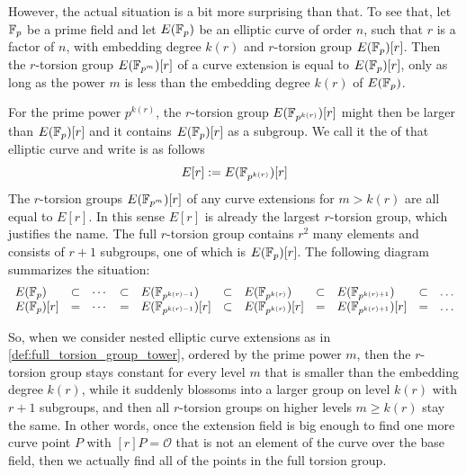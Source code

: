 However, the actual situation is a bit more surprising than that. To see that, let $\mathbb{F}_p$ be a prime field and let $E(\mathbb{F}_p)$ be an elliptic curve of order $n$, such that $r$ is a factor of $n$, with embedding degree $k(r)$ and $r$-torsion group $E(\mathbb{F}_p)[r]$. Then the $r$-torsion group $E(\mathbb{F}_{p^m})[r]$ of a curve extension is equal to $E(\mathbb{F}_p)[r]$, only as long as the power $m$ is less than the embedding degree $k(r)$ of $E(\mathbb{F}_p)$. 

For the prime power $p^{k(r)}$, the $r$-torsion group $E(\mathbb{F}_{p^{k(r)}})[r]$ might then be larger than $E(\mathbb{F}_p)[r]$ and it contains $E(\mathbb{F}_p)[r]$ as a subgroup. We call it the  of that elliptic curve and write is as follows
\begin{equation}
\label{def:full_torsion_group}
E[r] := E(\mathbb{F}_{p^{k(r)}})[r]
\end{equation}
The $r$-torsion groups $E(\mathbb{F}_{p^m})[r]$ of any curve extensions for $m>k(r)$ are all equal to $E[r]$. In this sense $E[r]$ is already the largest $r$-torsion group, which justifies the name. The full $r$-torsion group contains $r^2$ many elements and consists of $r+1$ subgroups, one of which is $E(\mathbb{F}_{p})[r]$. The following diagram summarizes the situation:
\begin{equation}
\label{def:full_torsion_group_tower}
\begin{array}{lccclclclcl}
E(\mathbb{F}_{p}) & \subset & \cdots  & \subset & E(\mathbb{F}_{p^{k(r)-1}}) & \subset & E(\mathbb{F}_{p^{k(r)}}) & \subset & E(\mathbb{F}_{p^{k(r)+1}}) & \subset & \ldots\\
E(\mathbb{F}_{p})[r] & = & \cdots  & = & E(\mathbb{F}_{p^{k(r)-1}})[r] & \subset & E(\mathbb{F}_{p^{k(r)}})[r] & = & 
E(\mathbb{F}_{p^{k(r)+1}})[r] & = & \ldots
\end{array}
\end{equation}

So, when we consider nested elliptic curve extensions as in \ref{def:full_torsion_group_tower}, ordered by the prime power $m$, then the $r$-torsion group stays constant for every level $m$ that is smaller than the embedding degree $k(r)$, while it suddenly blossoms into a larger group on level $k(r)$ with $r+1$ subgroups, and then all $r$-torsion groups on higher levels $m\geq k(r)$ stay the same. In other words, once the extension field is big enough to find one more curve point $P$ with $[r]P=\mathcal{O}$ that is not an element of the curve over the base field, then we actually find all of the points in the full torsion group.

